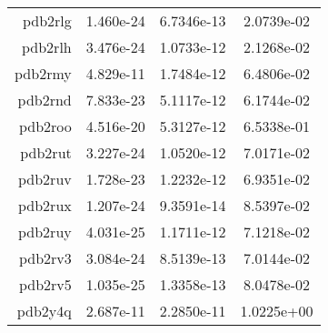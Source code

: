 \begin{xltabular}{\textwidth}{||rS[table-format=1.3e+2]S[table-format=1.4e+2]S[table-format=1.4e+2]||}
pdb2rlg & 1.460e-24 & 6.7346e-13 & 2.0739e-02 \\
pdb2rlh & 3.476e-24 & 1.0733e-12 & 2.1268e-02 \\
pdb2rmy & 4.829e-11 & 1.7484e-12 & 6.4806e-02 \\
pdb2rnd & 7.833e-23 & 5.1117e-12 & 6.1744e-02 \\
pdb2roo & 4.516e-20 & 5.3127e-12 & 6.5338e-01 \\
pdb2rut & 3.227e-24 & 1.0520e-12 & 7.0171e-02 \\
pdb2ruv & 1.728e-23 & 1.2232e-12 & 6.9351e-02 \\
pdb2rux & 1.207e-24 & 9.3591e-14 & 8.5397e-02 \\
pdb2ruy & 4.031e-25 & 1.1711e-12 & 7.1218e-02 \\
pdb2rv3 & 3.084e-24 & 8.5139e-13 & 7.0144e-02 \\
pdb2rv5 & 1.035e-25 & 1.3358e-13 & 8.0478e-02 \\
pdb2y4q & 2.687e-11 & 2.2850e-11 & 1.0225e+00 \\ \hline
\end{xltabular}
